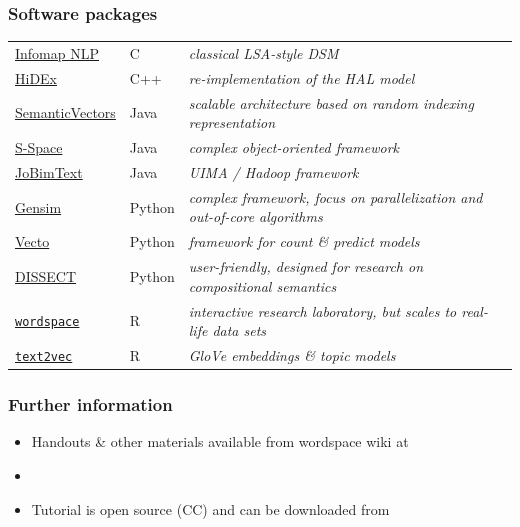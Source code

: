 \documentclass[t]{beamer} %
\begin{document}
\begin{frame}
  \frametitle{Software packages}

  \ungap
  \begin{tabular}{>{\color{secondary}}ll>{\itshape}p{6cm}}
    \href{http://infomap-nlp.sourceforge.net/}{Infomap NLP} & C & classical LSA-style DSM \\
    \href{http://www.psych.ualberta.ca/~westburylab/downloads/HiDEx.download.html}{HiDEx} & C++ & re-implementation of the HAL model \citep{Lund:Burgess:96} \\
    \href{http://code.google.com/p/semanticvectors/}{SemanticVectors} & Java & scalable architecture based on random indexing representation \\
    \href{http://github.com/fozziethebeat/S-Space}{S-Space} & Java & complex object-oriented framework \\
    \href{http://ltmaggie.informatik.uni-hamburg.de/jobimtext/}{JoBimText} & Java & UIMA / Hadoop framework \\
    \href{http://radimrehurek.com/gensim/}{Gensim} & Python & complex framework, focus on parallelization and out-of-core algorithms \\
    \href{http://vecto.space/}{Vecto} & Python & framework for count \& predict models \\
    \href{http://clic.cimec.unitn.it/composes/toolkit/}{DISSECT} & Python & user-friendly, designed for research on compositional semantics \\
    \href{http://wordspace.r-forge.r-project.org/}{\color{primary}\texttt{wordspace}} & R & interactive research laboratory, but scales to real-life data sets\\
    \href{http://text2vec.org/}{\texttt{text2vec}} & R & GloVe embeddings \& topic models
  \end{tabular}

  \gap[0.5]
  \hfill{}
\end{frame}

\begin{frame}
  \frametitle{Further information}

  \begin{itemize}
  \item Handouts \& other materials available from wordspace wiki at
    \begin{center}
    \end{center}
  \item[]
  \item Tutorial is open source (CC) and can be downloaded from
    \begin{center}\small
    \end{center}

  \end{itemize}

\end{frame}
\end{document}
